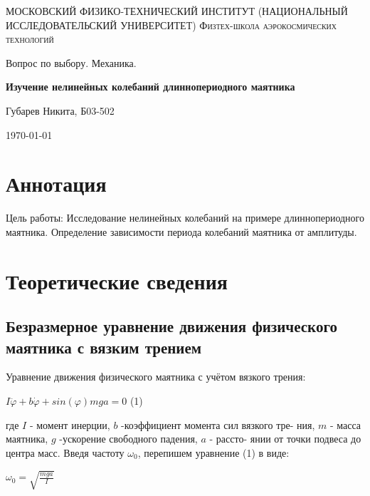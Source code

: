 \documentclass[a4paper]{article}
\begin{document}
\begin{titlepage}
	\centering
	{\scshape\Large МОСКОВСКИЙ ФИЗИКО-ТЕХНИЧЕСКИЙ ИНСТИТУТ 
	(НАЦИОНАЛЬНЫЙ ИССЛЕДОВАТЕЛЬСКИЙ УНИВЕРСИТЕТ) %
    Физтех-школа аэрокосмических технологий}
	
	\vspace{4cm} %
	{\LARGE Вопрос по выбору. Механика.}
	\vspace{1cm} %
	
{\huge\bf Изучение нелинейных колебаний  длиннопериодного маятника}
	
	\vspace{1cm} %
	\vfill %
	
    \begin{flushright} %
	   {\LARGE Губарев Никита, Б03-502}
    \end{flushright}
    \vfill 
	\today %
\end{titlepage}
\tableofcontents 
 \section{Аннотация}
Цель работы: Исследование нелинейных колебаний на примере длиннопериодного маятника. Определение зависимости периода колебаний маятника от амплитуды.

\section{Теоретические сведения}
\subsection{Безразмерное уравнение движения физического маятника с вязким трением}
Уравнение движения физического маятника с учётом вязкого трения:

\begin{center}$I\ddot{\varphi}+b\dot{\varphi}+sin(\varphi)mga =0$ (1)\end{center}
где $I$ - момент инерции, $b$ -коэффициент момента сил вязкого тре-
ния, $m$ - масса маятника, $g$ -ускорение свободного падения, $a$ - рассто-
янии от точки подвеса до центра масс. Введя частоту $\omega_0$, перепишем уравнение (1) в виде:

\begin{center}$\omega_0=\sqrt{\frac{mga}{I}}$\end{center}
\end{document}
